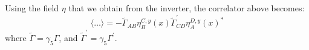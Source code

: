\documentclass{article}[12pt]
\begin{document}
Using the field $\eta$ that we obtain from the inverter, the
correlator above becomes:
%
\begin{equation}
\langle \ldots \rangle = - \tilde \Gamma_{AB} \eta^{C,y}_B(x)
\tilde \Gamma^\prime_{CD} \eta^{D,y}_A(x)^*
\end{equation}
where $\tilde \Gamma= \gamma_5 \Gamma$, and $\tilde \Gamma^\prime =
\gamma_5 \Gamma^\prime$.


\end{document}
